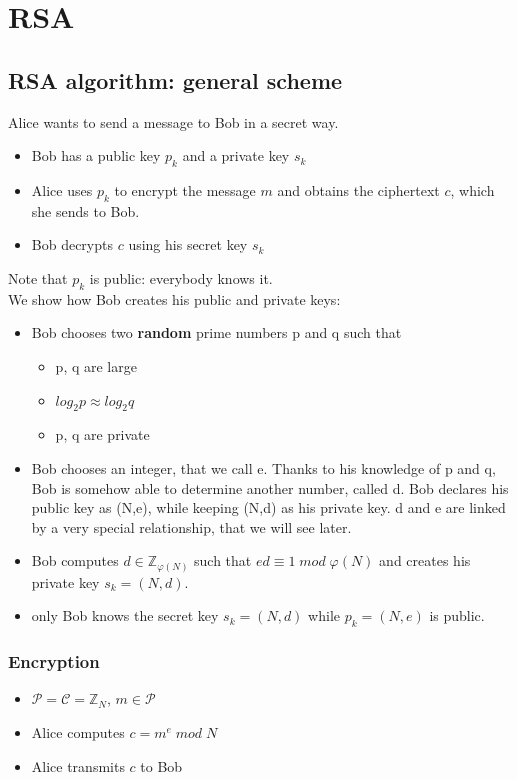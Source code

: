\documentclass[a4paper, 10pt, titlepage]{article}
\begin{document}
\newpage
\section{RSA}
\subsection{RSA algorithm: general scheme}
Alice wants to send a message to Bob in a secret way.
\begin{itemize}
\item Bob has a public key $p_k$ and a private key $s_k$
\item Alice uses $p_k$ to encrypt the message $m$ and obtains the ciphertext $c$, which she sends to Bob.
\item Bob decrypts $c$ using his secret key $s_k$
\end{itemize}
Note that $p_k$ is public: everybody knows it. \\
We show how Bob creates his public and private keys:
\begin{itemize}
\item Bob chooses two \textbf{random} prime numbers p and q such that
\begin{itemize}
\item p, q are large
\item $log_2 p \approx log_2 q$
\item p, q are private
\end{itemize}
\item Bob chooses an integer, that we call e. Thanks to his knowledge of p and q, Bob is somehow able to determine another number, called d. Bob declares his public key as (N,e), while keeping (N,d) as his private key. d and e are linked by a very special relationship, that we will see later.
\item Bob computes $d \in \mathbb{Z}_{\varphi(N)}$ such that $ed \equiv 1 \; mod \; \varphi(N)$ and creates his private key $s_k = (N, d)$.
\item only Bob knows the secret key $s_k = (N, d)$ while $p_k = (N, e)$ is public.
\end{itemize}
\subsubsection{Encryption}
\begin{itemize}
\item $\mathcal{P} = \mathcal{C} = \mathbb{Z}_N$, $m \in \mathcal{P}$
\item Alice computes $c = m^e \; mod \; N$
\item Alice transmits $c$ to Bob
\end{itemize}
\end{document}
